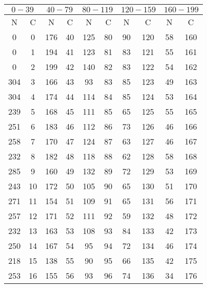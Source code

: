 \begin{table}
    \centering
    \caption{} 
    \label{1}
    \label{}
    \begin{tabular}{c c || c c || c c || c c || c c}
        \midrule
        \multicolumn{2}{c}{$0-39$} & \multicolumn{2}{c}{$40-79$} & \multicolumn{2}{c}{$80-119$} & \multicolumn{2}{c}{$120-159$} & \multicolumn{2}{c}{$160-199$} \\
        \midrule
        N & C & N & C & N & C & N & C & N & C \\
        \midrule
0        &   0     &176      &   40&125     &    80  &90      &120 & 58     & 160  \\
0        &   1     &194      &   41&123     &    81  &83      &121 & 55     & 161  \\
0        &   2     &199      &   42&140     &    82  &83      &122 & 54     & 162  \\
304      &   3     &166      &   43&93      &    83  &85      &123 & 49     & 163  \\
304      &   4     &174      &   44&114     &    84  &85      &124 & 53     & 164  \\
239      &   5     &168      &   45&111     &    85  &65      &125 & 55     & 165  \\
251      &   6     &183      &   46&112     &    86  &73      &126 & 46     & 166  \\
258      &   7     &170      &   47&124     &    87  &63      &127 & 46     & 167  \\
232      &   8     &182      &   48&118     &    88  &62      &128 & 58     & 168  \\
285      &   9     &160      &   49&132     &    89  &72      &129 & 53     & 169  \\
243      &   10    &172      &   50&105     &    90  &65      &130 & 51     & 170  \\
271      &   11    &154      &   51&109     &    91  &65      &131 & 56     & 171  \\
257      &   12    &171      &   52&111     &    92  &59      &132 & 48     & 172  \\
232      &   13    &163      &   53&108     &    93  &84      &133 & 42     & 173  \\
250      &   14    &167      &   54&95      &    94  &72      &134 & 46     & 174  \\
218      &   15    &138      &   55&90      &    95  &66      &135 & 42     & 175  \\
253      &   16    &155      &   56&93      &    96  &74      &136 & 34     & 176  \\

\end{tabular}
\end{table}
